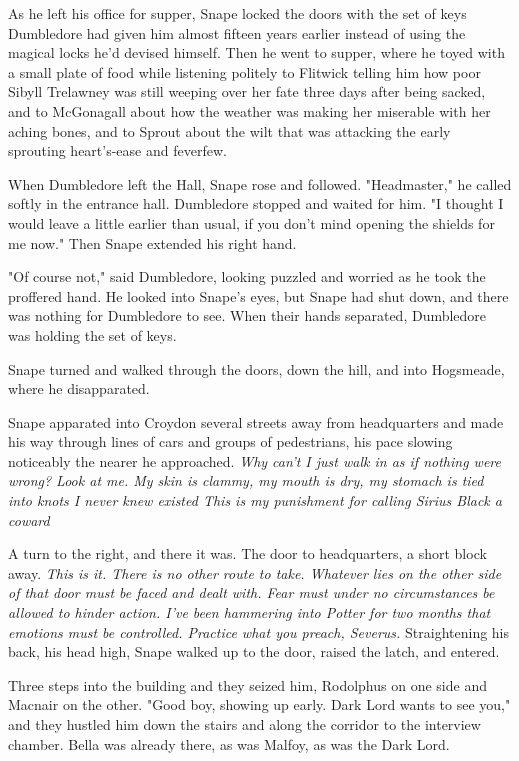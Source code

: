 As he left his office for supper, Snape locked the doors with the set of keys Dumbledore had given him almost fifteen years earlier instead of using the magical locks he'd devised himself. Then he went to supper, where he toyed with a small plate of food while listening politely to Flitwick telling him how poor Sibyll Trelawney was still weeping over her fate three days after being sacked, and to McGonagall about how the weather was making her miserable with her aching bones, and to Sprout about the wilt that was attacking the early sprouting heart's-ease and feverfew.

When Dumbledore left the Hall, Snape rose and followed. "Headmaster," he called softly in the entrance hall. Dumbledore stopped and waited for him. "I thought I would leave a little earlier than usual, if you don't mind opening the shields for me now." Then Snape extended his right hand.

"Of course not," said Dumbledore, looking puzzled and worried as he took the proffered hand. He looked into Snape's eyes, but Snape had shut down, and there was nothing for Dumbledore to see. When their hands separated, Dumbledore was holding the set of keys.

Snape turned and walked through the doors, down the hill, and into Hogsmeade, where he disapparated.

\sbreak

Snape apparated into Croydon several streets away from headquarters and made his way through lines of cars and groups of pedestrians, his pace slowing noticeably the nearer he approached. \emph{Why can't I just walk in as if nothing were wrong? Look at me. My skin is clammy, my mouth is dry, my stomach is tied into knots I never knew existed{\el} This is my punishment for calling Sirius Black a coward{\el}}

A turn to the right, and there it was. The door to headquarters, a short block away. \emph{This is it. There is no other route to take. Whatever lies on the other side of that door must be faced and dealt with. Fear must under no circumstances be allowed to hinder action. I've been hammering into Potter for two months that emotions must be controlled. Practice what you preach, Severus.} Straightening his back, his head high, Snape walked up to the door, raised the latch, and entered.

Three steps into the building and they seized him, Rodolphus on one side and Macnair on the other. "Good boy, showing up early. Dark Lord wants to see you," and they hustled him down the stairs and along the corridor to the interview chamber. Bella was already there, as was Malfoy, as was the Dark Lord.

